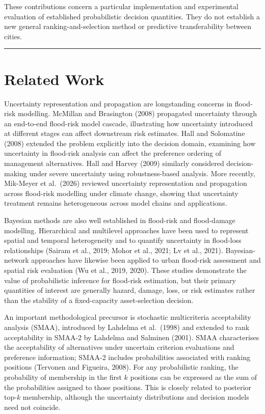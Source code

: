 \documentclass[
]{article}
\begin{document}
These contributions concern a particular implementation and experimental
evaluation of established probabilistic decision quantities. They do not
establish a new general ranking-and-selection method or predictive
transferability between cities.

\begin{center}\rule{0.5\linewidth}{0.5pt}\end{center}

\section{Related Work}\label{related-work}

Uncertainty representation and propagation are longstanding concerns in
flood-risk modelling. McMillan and Brasington (2008) propagated
uncertainty through an end-to-end flood-risk model cascade, illustrating
how uncertainty introduced at different stages can affect downstream
risk estimates. Hall and Solomatine (2008) extended the problem
explicitly into the decision domain, examining how uncertainty in
flood-risk analysis can affect the preference ordering of management
alternatives. Hall and Harvey (2009) similarly considered
decision-making under severe uncertainty using robustness-based
analysis. More recently, Mik-Meyer et al.~(2026) reviewed uncertainty
representation and propagation across flood-risk modelling under climate
change, showing that uncertainty treatment remains heterogeneous across
model chains and applications.

Bayesian methods are also well established in flood-risk and
flood-damage modelling. Hierarchical and multilevel approaches have been
used to represent spatial and temporal heterogeneity and to quantify
uncertainty in flood-loss relationships (Sairam et al., 2019; Mohor et
al., 2021; Lv et al., 2021). Bayesian-network approaches have likewise
been applied to urban flood-risk assessment and spatial risk evaluation
(Wu et al., 2019, 2020). These studies demonstrate the value of
probabilistic inference for flood-risk estimation, but their primary
quantities of interest are generally hazard, damage, loss, or risk
estimates rather than the stability of a fixed-capacity asset-selection
decision.

An important methodological precursor is stochastic multicriteria
acceptability analysis (SMAA), introduced by Lahdelma et al.~(1998) and
extended to rank acceptability in SMAA-2 by Lahdelma and Salminen
(2001). SMAA characterises the acceptability of alternatives under
uncertain criterion evaluations and preference information; SMAA-2
includes probabilities associated with ranking positions (Tervonen and
Figueira, 2008). For any probabilistic ranking, the probability of
membership in the first \(k\) positions can be expressed as the sum of
the probabilities assigned to those positions. This is closely related
to posterior top-\(k\) membership, although the uncertainty
distributions and decision models need not coincide.
\end{document}
